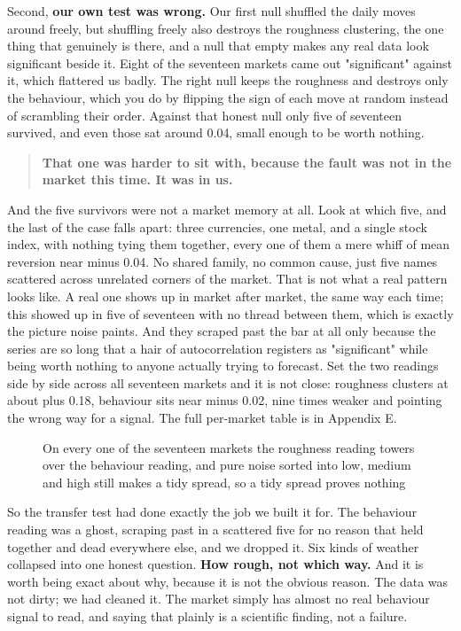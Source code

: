 \documentclass[11pt]{article} %
\begin{document}
Second, \textbf{our own test was wrong.} Our first null shuffled the daily moves around freely, but shuffling freely also destroys the roughness clustering, the one thing that genuinely is there, and a null that empty makes any real data look significant beside it. Eight of the seventeen markets came out "significant" against it, which flattered us badly. The right null keeps the roughness and destroys only the behaviour, which you do by flipping the sign of each move at random instead of scrambling their order. Against that honest null only five of seventeen survived, and even those sat around 0.04, small enough to be worth nothing.


\begin{quote}
\textbf{That one was harder to sit with, because the fault was not in the market this time. It was in us.}
\end{quote}


And the five survivors were not a market memory at all. Look at which five, and the last of the case falls apart: three currencies, one metal, and a single stock index, with nothing tying them together, every one of them a mere whiff of mean reversion near minus 0.04. No shared family, no common cause, just five names scattered across unrelated corners of the market. That is not what a real pattern looks like. A real one shows up in market after market, the same way each time; this showed up in five of seventeen with no thread between them, which is exactly the picture noise paints. And they scraped past the bar at all only because the series are so long that a hair of autocorrelation registers as "significant" while being worth nothing to anyone actually trying to forecast. Set the two readings side by side across all seventeen markets and it is not close: roughness clusters at about plus 0.18, behaviour sits near minus 0.02, nine times weaker and pointing the wrong way for a signal. The full per-market table is in Appendix E.

\begin{figure}[htbp]
\centering

\caption{On every one of the seventeen markets the roughness reading towers over the behaviour reading, and pure noise sorted into low, medium and high still makes a tidy spread, so a tidy spread proves nothing}
\end{figure}


So the transfer test had done exactly the job we built it for. The behaviour reading was a ghost, scraping past in a scattered five for no reason that held together and dead everywhere else, and we dropped it. Six kinds of weather collapsed into one honest question. \textbf{How rough, not which way.} And it is worth being exact about why, because it is not the obvious reason. The data was not dirty; we had cleaned it. The market simply has almost no real behaviour signal to read, and saying that plainly is a scientific finding, not a failure.
\end{document}
